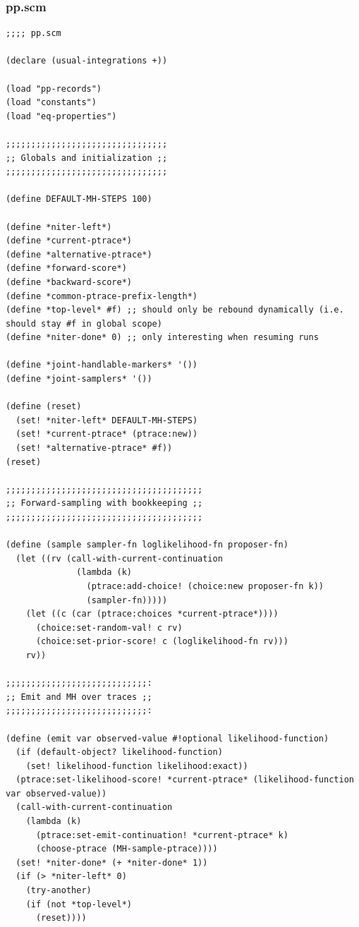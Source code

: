 \documentclass{article}
\begin{document}
\subsubsection{pp.scm}

\begin{verbatim}
;;;; pp.scm

(declare (usual-integrations +))

(load "pp-records")
(load "constants")
(load "eq-properties")

;;;;;;;;;;;;;;;;;;;;;;;;;;;;;;;;
;; Globals and initialization ;;
;;;;;;;;;;;;;;;;;;;;;;;;;;;;;;;;

(define DEFAULT-MH-STEPS 100)

(define *niter-left*)
(define *current-ptrace*)
(define *alternative-ptrace*)
(define *forward-score*)
(define *backward-score*)
(define *common-ptrace-prefix-length*)
(define *top-level* #f) ;; should only be rebound dynamically (i.e. should stay #f in global scope)
(define *niter-done* 0) ;; only interesting when resuming runs

(define *joint-handlable-markers* '())
(define *joint-samplers* '())

(define (reset)
  (set! *niter-left* DEFAULT-MH-STEPS)
  (set! *current-ptrace* (ptrace:new))
  (set! *alternative-ptrace* #f))
(reset)

;;;;;;;;;;;;;;;;;;;;;;;;;;;;;;;;;;;;;;;
;; Forward-sampling with bookkeeping ;;
;;;;;;;;;;;;;;;;;;;;;;;;;;;;;;;;;;;;;;;

(define (sample sampler-fn loglikelihood-fn proposer-fn)
  (let ((rv (call-with-current-continuation
              (lambda (k)
                (ptrace:add-choice! (choice:new proposer-fn k))
                (sampler-fn)))))
    (let ((c (car (ptrace:choices *current-ptrace*))))
      (choice:set-random-val! c rv)
      (choice:set-prior-score! c (loglikelihood-fn rv)))
    rv))

;;;;;;;;;;;;;;;;;;;;;;;;;;;;:
;; Emit and MH over traces ;;
;;;;;;;;;;;;;;;;;;;;;;;;;;;;:

(define (emit var observed-value #!optional likelihood-function)
  (if (default-object? likelihood-function)
    (set! likelihood-function likelihood:exact))
  (ptrace:set-likelihood-score! *current-ptrace* (likelihood-function var observed-value))
  (call-with-current-continuation
    (lambda (k)
      (ptrace:set-emit-continuation! *current-ptrace* k)
      (choose-ptrace (MH-sample-ptrace))))
  (set! *niter-done* (+ *niter-done* 1))
  (if (> *niter-left* 0)
    (try-another)
    (if (not *top-level*)
      (reset))))


\end{verbatim}
\end{document}

